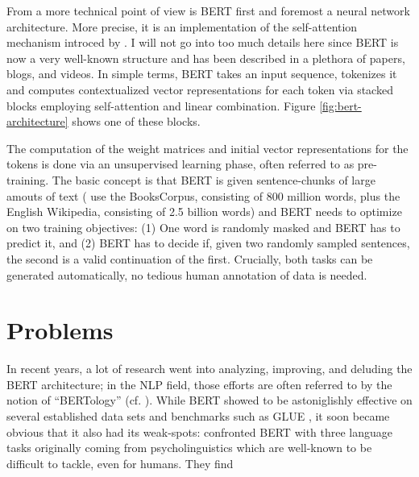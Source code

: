 From a more technical point of view is BERT first and foremost a neural network architecture. More precise, it is an
implementation of the self-attention mechanism introced by \cite{vaswani2017attention}. I will not go into
too much details here since BERT is now a very well-known structure and has been described in a
plethora of papers, blogs, and videos.
In simple terms, BERT takes an input sequence, tokenizes it and computes contextualized vector
representations for each token via stacked blocks employing self-attention and linear combination.
Figure \ref{fig:bert-architecture} shows one of these blocks.


The computation of the weight matrices and initial vector representations for the tokens is done
via an unsupervised learning phase, often referred to as pre-training. The basic concept is
that BERT is given sentence-chunks of large amouts of text (\citeauthor{devlin2018bert} use the BooksCorpus, consisting
of 800 million words, plus the English Wikipedia, consisting of 2.5 billion words) and BERT
needs to optimize on two training objectives: (1) One word is randomly masked and BERT has
to predict it, and (2) BERT has to decide if, given two randomly sampled sentences, the second
is a valid continuation of the first. Crucially, both tasks can be generated automatically, no
tedious human annotation of data is needed.

\section{Problems}

In recent years, a lot of research went into analyzing, improving, and deluding the BERT architecture;
in the NLP field, those efforts are often referred to by the notion of ``BERTology'' (cf. \cite{rogers2020primer}).
While BERT showed to be astoniglishly effective on several established data sets and benchmarks such as GLUE \citep{wang2018glue},
it soon became obvious that it also {\color{red} had} its weak-spots: \citeauthor{ettinger2020bert} confronted
BERT with three language tasks originally coming from psycholinguistics which are well-known to be difficult
to tackle, even for humans. They find

